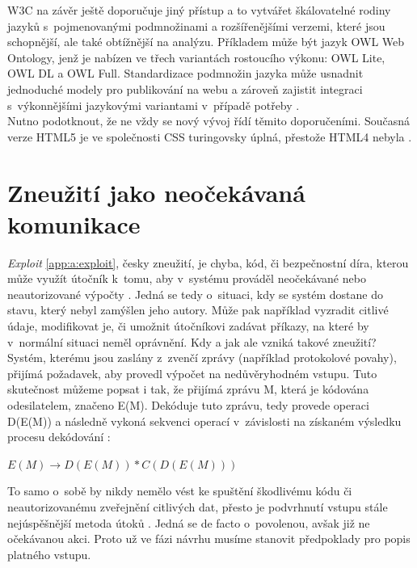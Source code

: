 W3C na závěr ještě doporučuje jiný přístup a to vytvářet škálovatelné rodiny jazyků s~pojmenovanými podmnožinami a rozšířenějšími verzemi, 
které jsou schopnější, ale také obtížnější na analýzu. Příkladem může být jazyk OWL Web Ontology, jenž je nabízen ve třech variantách rostoucího 
výkonu: OWL Lite, OWL DL a OWL Full. Standardizace podmnožin jazyka může usnadnit jednoduché modely pro publikování na webu a zároveň zajistit 
integraci s~výkonnějšími jazykovými variantami v~případě potřeby \cite{w3cpower}. \\

Nutno podotknout, že ne vždy se nový vývoj řídí těmito doporučeními. Současná verze HTML5 je ve společnosti CSS turingovsky úplná, 
přestože HTML4 nebyla \cite[str. 22]{Sass2011}.

\section{Zneužití jako neočekávaná komunikace} \label{sec:4:exploits}
\textit{Exploit} \ref{app:a:exploit}, česky zneužití, je chyba, kód, či bezpečnostní díra, kterou může využít útočník k~tomu, aby v~systému prováděl 
neočekávané nebo neautorizované výpočty \cite[str. 135]{Slovnik2015}. Jedná se tedy o~situaci, kdy se systém dostane do stavu, který nebyl zamýšlen 
jeho autory. Může pak například vyzradit citlivé údaje, modifikovat je, či umožnit útočníkovi zadávat příkazy, na které by v~normální situaci neměl 
oprávnění. Kdy a jak ale vzniká takové zneužití? \\

Systém, kterému jsou zaslány z~zvenčí zprávy (například protokolové povahy), přijímá požadavek, aby provedl výpočet na nedůvěryhodném vstupu. 
Tuto skutečnost můžeme popsat i tak, že přijímá zprávu M, která je kódována odesilatelem, značeno E(M). Dekóduje tuto zprávu, tedy provede operaci 
D(E(M)) a následně vykoná sekvenci operací v~závislosti na získaném výsledku procesu dekódování \cite[str. 492]{Sass2013}:
\vspace*{\baselineskip}
\begin{center}  
$E(M) \rightarrow D(E(M)) * C(D(E(M))) $
\end{center}
\vspace*{\baselineskip}
To samo o~sobě by nikdy nemělo vést ke spuštění škodlivému kódu či neautorizovanému zveřejnění citlivých dat, přesto je podvrhnutí vstupu stále 
nejúspěšnější metoda útoků \cite[str. 492]{Sass2013}. Jedná se de facto o~povolenou, avšak již ne očekávanou akci. Proto už ve fázi návrhu 
musíme stanovit předpoklady pro popis platného vstupu. 

